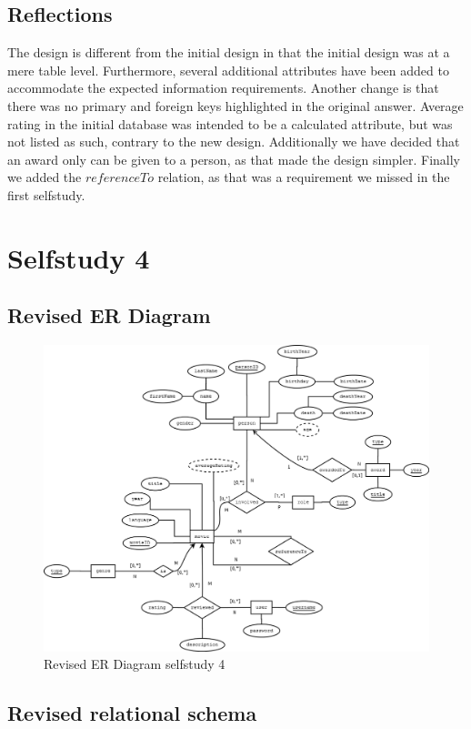\documentclass[10pt,a4paper,final]{report}
\begin{document}
\subsection*{Reflections}
The design is different from the initial design in that the initial design was at a mere table level. Furthermore, several additional attributes have been added to accommodate the expected information requirements.
Another change is that there was no primary and foreign keys highlighted in the original answer.
Average rating in the initial database was intended to be a calculated attribute, but was not listed as such, contrary to the new design.
Additionally we have decided that an award only can be given to a person, as that made the design simpler.
Finally we added the $referenceTo$ relation, as that was a requirement we missed in the first selfstudy.


\section*{Selfstudy 4}
\subsection*{Revised ER Diagram}
\begin{figure}[H]
     \includegraphics[scale=0.4]{ERdiagramrevisioned}
     \caption{Revised ER Diagram selfstudy 4}
\end{figure}
\subsection*{Revised relational schema}
\end{document}
